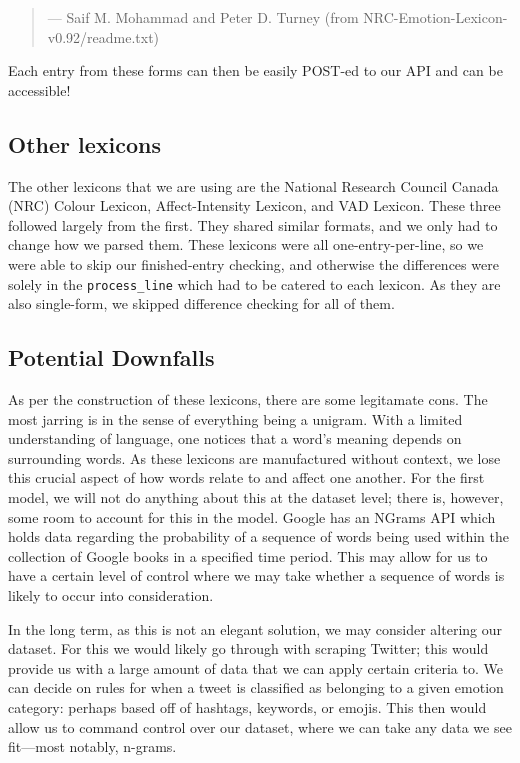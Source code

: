 \documentclass[11pt, twoside, reqno]{book}
\begin{document}
\begin{quote}
— Saif M. Mohammad and Peter D. Turney (from NRC-Emotion-Lexicon-v0.92/readme.txt)
\end{quote}

Each entry from these forms can then be easily POST-ed to our API and can be accessible!

\subsection{Other lexicons}

The other lexicons that we are using are the National Research Council Canada (NRC) Colour Lexicon, Affect-Intensity Lexicon, and VAD Lexicon. These three followed largely from the first. They shared similar formats, and we only had to change how we parsed them. These lexicons were all one-entry-per-line, so we were able to skip our finished-entry checking, and otherwise the differences were solely in the \texttt{process\_line} which had to be catered to each lexicon. As they are also single-form, we skipped difference checking for all of them.

\subsection{Potential Downfalls}

As per the construction of these lexicons, there are some legitamate cons. The most jarring is in the sense of everything being a unigram. With a limited understanding of language, one notices that a word's meaning depends on surrounding words. As these lexicons are manufactured without context, we lose this crucial aspect of how words relate to and affect one another. For the first model, we will not do anything about this at the dataset level; there is, however, some room to account for this in the model. Google has an NGrams API which holds data regarding the probability of a sequence of words being used within the collection of Google books in a specified time period. This may allow for us to have a certain level of control where we may take whether a sequence of words is likely to occur into consideration.

In the long term, as this is not an elegant solution, we may consider altering our dataset. For this we would likely go through with scraping Twitter; this would provide us with a large amount of data that we can apply certain criteria to. We can decide on rules for when a tweet is classified as belonging to a given emotion category: perhaps based off of hashtags, keywords, or emojis. This then would allow us to command control over our dataset, where we can take any data we see fit—most notably, n-grams.
\end{document}
